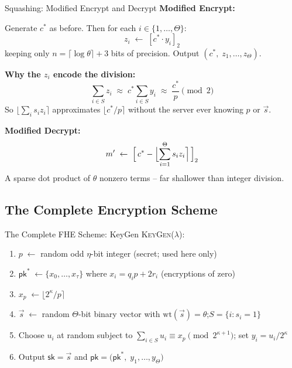 \documentclass[10pt]{beamer}
\begin{document}
\begin{frame}{Squashing: Modified Encrypt and Decrypt}
    \textbf{Modified Encrypt:}

    Generate $c^*$ as before. Then for each $i \in \{1,\ldots,\Theta\}$:
    \[
        z_i \;\leftarrow\; [c^* \cdot y_i]_2
    \]
    keeping only $n = \lceil\log\theta\rceil + 3$ bits of precision.
    Output $(c^*,\; z_1, \ldots, z_\Theta)$.
    \pause

    \vspace{0.2cm}
    \textbf{Why the $z_i$ encode the division:}
    \[
        \sum_{i \in S} z_i
        \;\approx\; c^* \sum_{i \in S} y_i
        \;\approx\; \frac{c^*}{p} \pmod{2}
    \]
    So $\lfloor \sum_i s_i z_i \rceil$ approximates $\lfloor c^*/p \rceil$
    without the server ever knowing $p$ or $\vec{s}$.
    \pause

    \vspace{0.2cm}
    \textbf{Modified Decrypt:}
    \[
        m' \;\leftarrow\;
        \Bigl[\, c^* - \Bigl\lfloor \sum_{i=1}^\Theta s_i z_i \Bigr\rceil \,\Bigr]_2
    \]
    A sparse dot product of $\theta$ nonzero terms  --  far shallower than
    integer division.
\end{frame}

\subsection{The Complete Encryption Scheme}

\begin{frame}{The Complete FHE Scheme: KeyGen}
    \textsc{KeyGen}($\lambda$):
    \begin{enumerate}
        \item $p \;\leftarrow$ random odd $\eta$-bit integer
              \hfill{\small(secret; used here only)}
        \item $\mathsf{pk}^* \;\leftarrow \{x_0,\ldots,x_\tau\}$
              where $x_i = q_i p + 2r_i$
              \hfill{\small(encryptions of zero)}
        \item $x_p \;\leftarrow \lfloor 2^\kappa/p \rceil$
        \item $\vec{s} \;\leftarrow$ random $\Theta$-bit binary vector
              with $\mathrm{wt}(\vec{s}) = \theta$;\quad $S = \{i : s_i = 1\}$
        \item Choose $u_i$ at random subject to
              $\displaystyle\sum_{i\in S} u_i \equiv x_p \pmod{2^{\kappa+1}}$;\quad
              set $y_i = u_i/2^\kappa$
        \item Output $\mathsf{sk} = \vec{s}$ and
              $\mathsf{pk} = \bigl(\mathsf{pk}^*,\; y_1, \ldots, y_\Theta\bigr)$
    \end{enumerate}
\end{frame}
\end{document}
